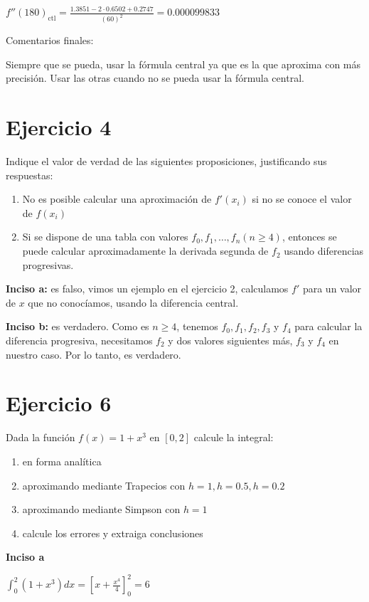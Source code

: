 \documentclass[11pt]{article}
\begin{document}
	$\displaystyle f''(180)_{\text{ctl}}=\frac{1.3851-2\cdot 0.6502 + 0.2747}{(60)^2}=0.000099833$
	
	Comentarios finales:
	
	Siempre que se pueda, usar la fórmula central ya que es la que aproxima con más precisión. Usar las otras cuando no se pueda usar la fórmula central.
	
	
	\section{Ejercicio 4}
	Indique el valor de verdad de las siguientes proposiciones, justificando sus respuestas:
	
	\begin{enumerate}[label=\alph*)]
		\item No es posible calcular una aproximación de $f'(x_i)$ si no se conoce el valor de $f(x_i)$
		\item Si se dispone de una tabla con valores $f_0, f_1,\dots,f_n (n\ge4)$, entonces se puede calcular aproximadamente la derivada segunda de $f_2$ usando diferencias progresivas.
	\end{enumerate}

	\textbf{Inciso a:} es falso, vimos un ejemplo en el ejercicio 2, calculamos $f'$ para un valor de $x$ que no conocíamos, usando la diferencia central.
	
	\textbf{Inciso b:} es verdadero. Como es $n \ge 4$, tenemos $f_0, f_1, f_2, f_3$ y $f_4$ para calcular la diferencia progresiva, necesitamos $f_2$ y dos valores siguientes más, $f_3$ y $f_4$ en nuestro caso. Por lo tanto, es verdadero.

	\section{Ejercicio 6}
	Dada la función $f(x)=1+x^3$ en $[0,2]$ calcule la integral:
	\begin{enumerate}[label=\alph*)]
		\item en forma analítica
		\item aproximando mediante Trapecios con $h=1, h=0.5, h=0.2$
		\item aproximando mediante Simpson con $h=1$
		\item calcule los errores y extraiga conclusiones
	\end{enumerate}

	\textbf{Inciso a}
	
	$\displaystyle \int_{0}^{2}(1+x^3)dx=\left[ x+\frac{x^4}{4}\right]_0^2=6$
	
\end{document}
